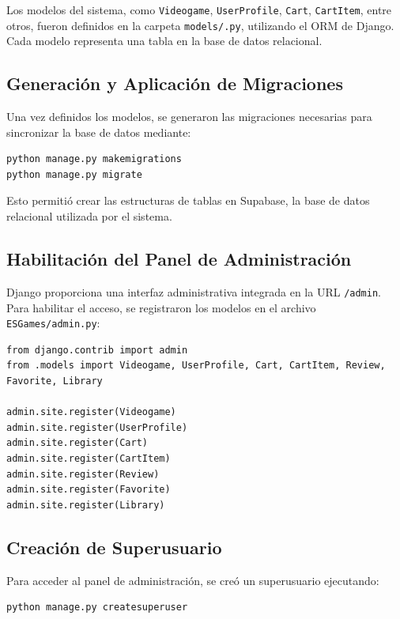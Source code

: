 \documentclass{article}
\begin{document}
Los modelos del sistema, como \texttt{Videogame}, \texttt{UserProfile}, \texttt{Cart}, \texttt{CartItem}, entre otros, fueron definidos en la carpeta \texttt{models/.py}, utilizando el ORM de Django. Cada modelo representa una tabla en la base de datos relacional.

\subsection{Generación y Aplicación de Migraciones}

Una vez definidos los modelos, se generaron las migraciones necesarias para sincronizar la base de datos mediante:

\begin{verbatim}
python manage.py makemigrations
python manage.py migrate
\end{verbatim}

Esto permitió crear las estructuras de tablas en Supabase, la base de datos relacional utilizada por el sistema.

\subsection{Habilitación del Panel de Administración}

Django proporciona una interfaz administrativa integrada en la URL \texttt{/admin}. Para habilitar el acceso, se registraron los modelos en el archivo \texttt{ESGames/admin.py}:

\begin{verbatim}
from django.contrib import admin
from .models import Videogame, UserProfile, Cart, CartItem, Review, Favorite, Library

admin.site.register(Videogame)
admin.site.register(UserProfile)
admin.site.register(Cart)
admin.site.register(CartItem)
admin.site.register(Review)
admin.site.register(Favorite)
admin.site.register(Library)
\end{verbatim}

\subsection{Creación de Superusuario}

Para acceder al panel de administración, se creó un superusuario ejecutando:

\begin{verbatim}
python manage.py createsuperuser
\end{verbatim}
\end{document}
